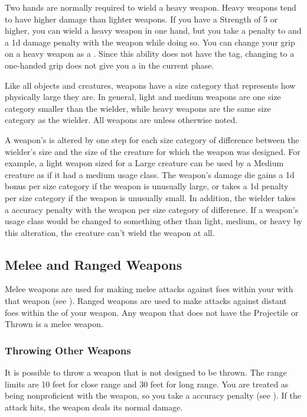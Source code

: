          Two hands are normally required to wield a heavy weapon.
        Heavy weapons tend to have higher damage than lighter weapons.
        If you have a Strength of 5 or higher, you can wield a heavy weapon in one hand, but you take a  penalty to  and a \minus1d damage penalty with the weapon while doing so.
        You can change your grip on a heavy weapon as a .
        Since this ability does not have the  tag, changing to a one-handed grip does not give you a  in the current phase.

         Like all objects and creatures, weapons have a size category that represents how physically large they are. In general, light and medium weapons are one size category smaller than the wielder, while heavy weapons are the same size category as the wielder.
        All weapons are  unless otherwise noted.

        \label{Inappropriately Sized Weapons} A weapon's  is altered by one step for each size category of difference between the wielder's size and the size of the creature for which the weapon was designed.
        For example, a light weapon sized for a Large creature can be used by a Medium creature as if it had a medium usage class.
        The weapon's damage die gains a \plus1d bonus per size category if the weapon is unusually large, or takes a \minus1d penalty per size category if the weapon is unusually small.
        In addition, the wielder takes a  accuracy penalty with the weapon per size category of difference.
        If a weapon's usage class would be changed to something other than light, medium, or heavy by this alteration, the creature can't wield the weapon at all.

    \subsection{Melee and Ranged Weapons}
        Melee weapons are used for making melee attacks against foes within your  with that weapon (see ).
        Ranged weapons are used to make attacks against distant foes within the  of your weapon.
        Any weapon that does not have the Projectile or Thrown  is a melee weapon.

            \subsubsection{Throwing Other Weapons} It is possible to throw a weapon that is not designed to be thrown.
            The range limits are 10 feet for close range and 30 feet for long range.
            You are treated as being nonproficient with the weapon, so you take a  accuracy penalty (see ).
            If the attack hits, the weapon deals its normal damage.

